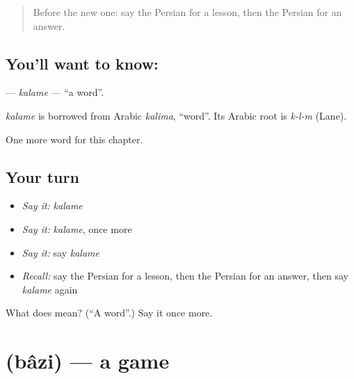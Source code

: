 \label{lesson:FA-C50-kalame}



\begin{quote}
Before the new one: say the Persian for a lesson, then the Persian for an answer.
\end{quote}

\subsection*{You'll want to know: }
\textbf{} — \emph{kalame} — \textquotedblleft{}a word\textquotedblright{}.

\begin{cousinweb}
\emph{kalame} is borrowed from Arabic \emph{kalima}, \textquotedblleft{}word\textquotedblright{}. Its Arabic root is \emph{k-l-m} (Lane).
\end{cousinweb}

\begin{grammarlens}[title={What you've built}]
One more word for this chapter.
\end{grammarlens}

\subsection*{Your turn}
\begin{itemize}
\raggedright
  \item \emph{Say it:} \emph{kalame}
  \item \emph{Say it:} \emph{kalame}, once more
  \item \emph{Say it:} say \emph{kalame}
  \item \emph{Recall:} say the Persian for a lesson, then the Persian for an answer, then say \emph{kalame} again
\end{itemize}

\begin{tcolorbox}[breakable,colback=teal!4,colframe=teal!35!black,title={Before you move on}]
What does  mean? (\textquotedblleft{}A word\textquotedblright{}.) Say it once more.
\end{tcolorbox}
\section[\texorpdfstring{\fa{بازی} (bâzi)}{بازی (bâzi)}]{ (bâzi) — a game}

\label{lesson:FA-C50-bazi}



